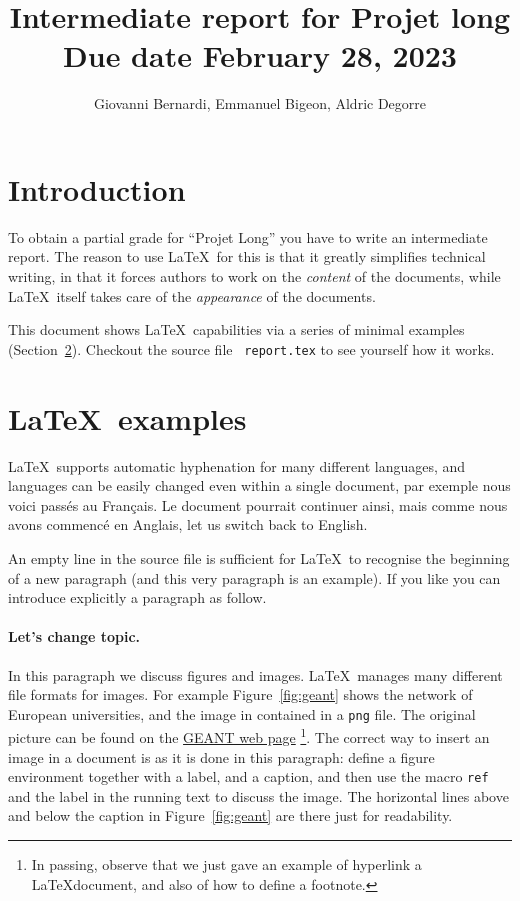\documentclass{article}
\title{Intermediate report for Projet long\\ Due date February 28, 2023}
\author{Giovanni Bernardi, Emmanuel Bigeon, Aldric Degorre}
\newcommand{\latex}{\LaTeX}
\begin{document}
\maketitle


\section{Introduction}
To obtain a partial grade for \foreignlanguage{french}{``Projet Long''}
you have to write an intermediate report.
The reason to use \latex\ for this is that it greatly simplifies technical writing,
in that it forces authors to work on the {\em content} of the documents,
while \latex\  itself takes care of the {\em appearance} of the documents.

This document shows \latex\  capabilities via a series of minimal
examples (Section~\ref{sec:latex-examples}). Checkout the source file {\tt
  report.tex} to see yourself how it works.

\section{\latex\  examples}
\label{sec:latex-examples}
\latex\  supports automatic hyphenation for many different languages,
and languages can be easily changed even within a single document,
par exemple nous voici passés au Français. Le document pourrait continuer ainsi,
mais comme nous avons commencé en Anglais,
let us switch back to English.

An empty line in the source file is sufficient for \latex\  to
recognise the beginning of a new paragraph (and this very
paragraph is an example). If you like you can introduce explicitly
a paragraph as follow.

\paragraph{Let's change topic.} In this paragraph we discuss figures
and images. \latex\  manages many different file formats for images.
For example Figure~\ref{fig:geant} shows the network of European universities,
and the image in contained in a {\tt png} file.
The original picture can be found on the \href{https://www.geant.org/}{GEANT web page}
\footnote{In passing, observe that we just gave an example of hyperlink a
\latex document, and also of how to define a footnote.}.
The correct way to insert an image in a document is as it is done in this
paragraph: define a figure environment together with a label, and a caption,
and then use the macro {\tt ref} and the label in the running text
to discuss the image. The horizontal lines above and below the caption in
Figure~\ref{fig:geant} are there just for readability.
\end{document}
